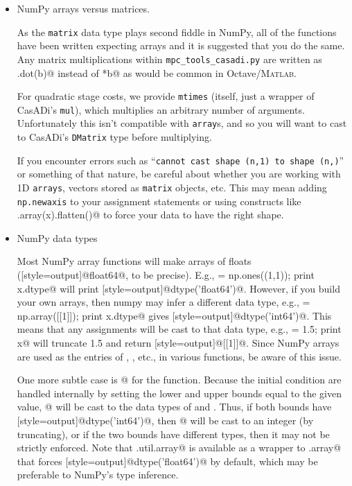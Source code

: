 \documentclass{article}
\providecommand{\lstinline}{}
\newcommand{\casadi}{CasADi}
\begin{document}
\begin{itemize}
    \item NumPy arrays versus matrices.
    
    As the \texttt{matrix} data type plays second fiddle in NumPy, all of the functions have been written expecting arrays and it is suggested that you do the same.
    Any matrix multiplications within \texttt{mpc\_tools\_casadi.py} are written as \lstinline@A.dot(b)@ instead of \lstinline@A*b@ as would be common in Octave/\textsc{Matlab}.
    
    For quadratic stage costs, we provide \texttt{mtimes} (itself, just a wrapper of \casadi{}'s \texttt{mul}), which multiplies an arbitrary number of arguments.
    Unfortunately this isn't compatible with \texttt{array}s, and so you will want to cast to \casadi{}'s \texttt{DMatrix} type before multiplying.
    
    If you encounter errors such as ``\texttt{cannot cast shape (n,1) to shape (n,)}'' or something of that nature, be careful about whether you are working with 1D \texttt{arrays}, vectors stored as \texttt{matrix} objects, etc.
    This may mean adding \texttt{np.newaxis} to your assignment statements or using constructs like \lstinline@np.array(x).flatten()@ to force your data to have the right shape.
    
    \item NumPy data types
    
    Most NumPy array functions will make arrays of floats (\lstinline[style=output]@float64@, to be precise).
    E.g., \lstinline@x = np.ones((1,1)); print x.dtype@ will print \lstinline[style=output]@dtype('float64')@.
    However, if you build your own arrays, then numpy may infer a different data type, e.g., \lstinline@x = np.array([[1]]); print x.dtype@ gives \lstinline[style=output]@dtype('int64')@.
    This means that any assignments will be cast to that data type, e.g., \lstinline@x[0,0] = 1.5; print x@ will truncate 1.5 and return \lstinline[style=output]@[[1]]@.
    Since NumPy arrays are used as the entries of \lstinline@lb@, \lstinline@ub@, etc., in various functions, be aware of this issue.
    
    One more subtle case is @ for the \lstinline@nmpc@ function.
    Because the initial condition are handled internally by setting the lower and upper bounds equal to the given value, @ will be cast to the data types of \lstinline@lb@ and \lstinline@ub@.
    Thus, if both bounds have \lstinline[style=output]@dtype('int64')@, then @ will be cast to an integer (by truncating), or if the two bounds have different types, then it may not be strictly enforced.
    Note that \lstinline@mpctools.util.array@ is available as a wrapper to \lstinline@numpy.array@ that forces \lstinline[style=output]@dtype('float64')@ by default, which may be preferable to NumPy's type inference.
    

\end{itemize}
\end{document}
